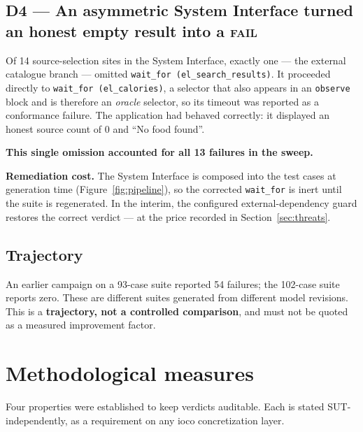 \documentclass[11pt,a4paper]{article}
\newcommand{\gate}[1]{\texttt{\small #1}}
\newcommand{\dref}[1]{\textbf{D#1}}
\begin{document}
\subsection*{\dref{4} --- An asymmetric System Interface turned an honest empty
result into a \textsc{fail}}

Of 14 source-selection sites in the System Interface, exactly one --- the external
catalogue branch --- omitted \gate{wait\_for (el\_search\_results)}. It proceeded
directly to \gate{wait\_for (el\_calories)}, a selector that also appears in an
\texttt{observe} block and is therefore an \emph{oracle} selector, so its timeout
was reported as a conformance failure. The application had behaved correctly: it
displayed an honest source count of 0 and ``No food found''.

\textbf{This single omission accounted for all 13 failures in the sweep.}

\medskip
\noindent\textbf{Remediation cost.} The System Interface is composed into the test
cases at generation time (Figure~\ref{fig:pipeline}), so the corrected
\texttt{wait\_for} is inert until the suite is regenerated. In the interim, the
configured external-dependency guard restores the correct verdict --- at the price
recorded in Section~\ref{sec:threats}.

\subsection{Trajectory}

An earlier campaign on a 93-case suite reported 54 failures; the 102-case suite
reports zero. These are different suites generated from different model revisions.
This is a \textbf{trajectory, not a controlled comparison}, and must not be quoted
as a measured improvement factor.

\section{Methodological measures}

Four properties were established to keep verdicts auditable. Each is stated
SUT-independently, as a requirement on any ioco concretization layer.
\end{document}
